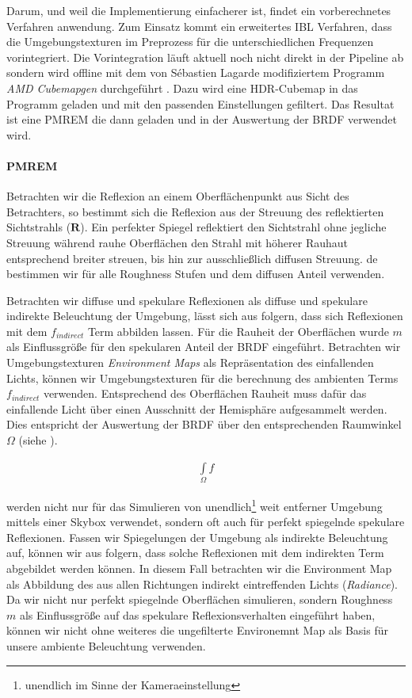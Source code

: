 Darum, und weil die Implementierung einfacherer ist, findet ein vorberechnetes Verfahren anwendung. Zum Einsatz kommt ein erweitertes \acf{IBL} Verfahren, dass die Umgebungstexturen im Preprozess für die unterschiedlichen Frequenzen vorintegriert. Die Vorintegration läuft aktuell noch nicht direkt in der Pipeline ab sondern wird offline mit dem von Sébastien Lagarde modifiziertem Programm \textit{AMD Cubemapgen} durchgeführt \parencite{Lagarde2012a}. Dazu wird eine HDR-Cubemap in das Programm geladen und mit den passenden Einstellungen gefiltert. Das Resultat ist eine \ac{PMREM} die dann geladen und in der Auswertung der \ac{BRDF} verwendet wird.

\paragraph{\acl{PMREM}} Betrachten wir die Reflexion an einem Oberflächenpunkt aus Sicht des Betrachters, so bestimmt sich die Reflexion aus der Streuung des reflektierten Sichtstrahls ($\mathbf R$). Ein perfekter Spiegel reflektiert den Sichtstrahl ohne jegliche Streuung während rauhe Oberflächen den Strahl mit höherer Rauhaut entsprechend breiter streuen, bis hin zur ausschließlich diffusen Streuung. de bestimmen wir für alle Roughness Stufen und dem diffusen Anteil verwenden.

Betrachten wir diffuse und spekulare Reflexionen als diffuse und spekulare indirekte Beleuchtung der Umgebung, lässt sich aus  folgern, dass sich Reflexionen mit dem $f_{indirect}$ Term abbilden lassen. Für die Rauheit der Oberflächen wurde $m$ als Einflussgröße für den spekularen Anteil der \ac{BRDF} eingeführt. Betrachten wir Umgebungstexturen \textit{Environment Maps} als Repräsentation des einfallenden Lichts, können wir Umgebungstexturen für die berechnung des ambienten Terms $f_{indirect}$ verwenden. Entsprechend des Oberflächen Rauheit muss dafür das einfallende Licht über einen Ausschnitt der Hemisphäre aufgesammelt werden. Dies entspricht der Auswertung der \ac{BRDF} über den entsprechenden Raumwinkel $\Omega$ (siehe ).

\begin{align}
	\label{eq:ambient-integral}
	\int\limits_{\Omega} f
\end{align}

werden nicht nur für das Simulieren von unendlich\footnote{unendlich im Sinne der Kameraeinstellung} weit entferner Umgebung mittels einer Skybox verwendet, sondern oft auch für perfekt spiegelnde spekulare Reflexionen. Fassen wir Spiegelungen der Umgebung als indirekte Beleuchtung auf, können wir aus  folgern, dass solche Reflexionen mit dem indirekten Term abgebildet werden können. In diesem Fall betrachten wir die Environment Map als Abbildung des aus allen Richtungen indirekt eintreffenden Lichts (\textit{Radiance}). Da wir nicht nur perfekt spiegelnde Oberflächen simulieren, sondern Roughness $m$ als Einflussgröße auf das spekulare Reflexionsverhalten eingeführt haben, können wir nicht ohne weiteres die ungefilterte Environemnt Map als Basis für unsere ambiente Beleuchtung verwenden. 

